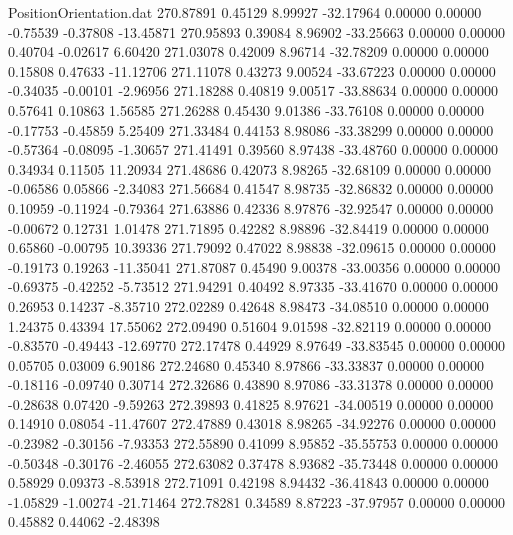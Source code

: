 \begin{filecontents}{PositionOrientation.dat}
 270.87891    0.45129    8.99927   -32.17964    0.00000    0.00000   -0.75539   -0.37808  -13.45871
 270.95893    0.39084    8.96902   -33.25663    0.00000    0.00000    0.40704   -0.02617    6.60420
 271.03078    0.42009    8.96714   -32.78209    0.00000    0.00000    0.15808    0.47633  -11.12706
 271.11078    0.43273    9.00524   -33.67223    0.00000    0.00000   -0.34035   -0.00101   -2.96956
 271.18288    0.40819    9.00517   -33.88634    0.00000    0.00000    0.57641    0.10863    1.56585
 271.26288    0.45430    9.01386   -33.76108    0.00000    0.00000   -0.17753   -0.45859    5.25409
 271.33484    0.44153    8.98086   -33.38299    0.00000    0.00000   -0.57364   -0.08095   -1.30657
 271.41491    0.39560    8.97438   -33.48760    0.00000    0.00000    0.34934    0.11505   11.20934
 271.48686    0.42073    8.98265   -32.68109    0.00000    0.00000   -0.06586    0.05866   -2.34083
 271.56684    0.41547    8.98735   -32.86832    0.00000    0.00000    0.10959   -0.11924   -0.79364
 271.63886    0.42336    8.97876   -32.92547    0.00000    0.00000   -0.00672    0.12731    1.01478
 271.71895    0.42282    8.98896   -32.84419    0.00000    0.00000    0.65860   -0.00795   10.39336
 271.79092    0.47022    8.98838   -32.09615    0.00000    0.00000   -0.19173    0.19263  -11.35041
 271.87087    0.45490    9.00378   -33.00356    0.00000    0.00000   -0.69375   -0.42252   -5.73512
 271.94291    0.40492    8.97335   -33.41670    0.00000    0.00000    0.26953    0.14237   -8.35710
 272.02289    0.42648    8.98473   -34.08510    0.00000    0.00000    1.24375    0.43394   17.55062
 272.09490    0.51604    9.01598   -32.82119    0.00000    0.00000   -0.83570   -0.49443  -12.69770
 272.17478    0.44929    8.97649   -33.83545    0.00000    0.00000    0.05705    0.03009    6.90186
 272.24680    0.45340    8.97866   -33.33837    0.00000    0.00000   -0.18116   -0.09740    0.30714
 272.32686    0.43890    8.97086   -33.31378    0.00000    0.00000   -0.28638    0.07420   -9.59263
 272.39893    0.41825    8.97621   -34.00519    0.00000    0.00000    0.14910    0.08054  -11.47607
 272.47889    0.43018    8.98265   -34.92276    0.00000    0.00000   -0.23982   -0.30156   -7.93353
 272.55890    0.41099    8.95852   -35.55753    0.00000    0.00000   -0.50348   -0.30176   -2.46055
 272.63082    0.37478    8.93682   -35.73448    0.00000    0.00000    0.58929    0.09373   -8.53918
 272.71091    0.42198    8.94432   -36.41843    0.00000    0.00000   -1.05829   -1.00274  -21.71464
 272.78281    0.34589    8.87223   -37.97957    0.00000    0.00000    0.45882    0.44062   -2.48398

\end{filecontents}
